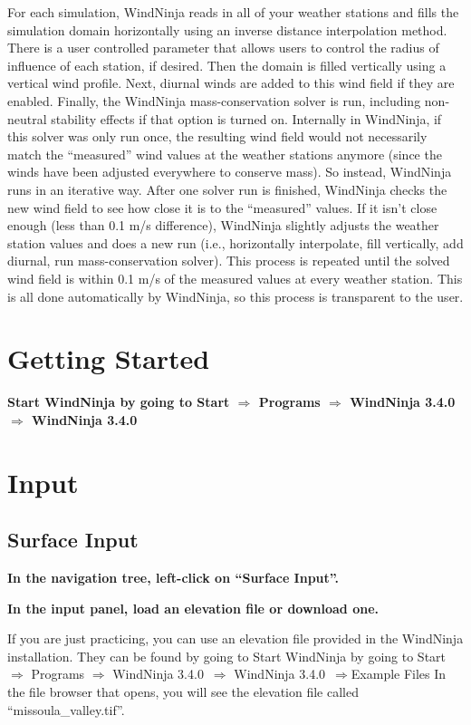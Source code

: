 \documentclass[12pt]{article}
\newcommand\vn{3.4.0}
\begin{document}
For each simulation, WindNinja reads in all of your weather stations and fills the simulation domain horizontally using an inverse distance interpolation method.  There is a user controlled parameter that allows users to control the radius of influence of each station, if desired.  Then the domain is filled vertically using a vertical wind profile.  Next, diurnal winds are added to this wind field if they are enabled.  Finally, the WindNinja mass-conservation solver is run, including non-neutral stability effects if that option is turned on.  Internally in WindNinja, if this solver was only run once, the resulting wind field would not necessarily match the “measured” wind values at the weather stations anymore (since the winds have been adjusted everywhere to conserve mass).  So instead, WindNinja runs in an iterative way.  After one solver run is finished, WindNinja checks the new wind field to see how close it is to the “measured” values.  If it isn't close enough (less than 0.1 m/s difference), WindNinja slightly adjusts the weather station values and does a new run (i.e., horizontally interpolate, fill vertically, add diurnal, run mass-conservation solver).  This process is repeated until the solved wind field is within 0.1 m/s of the measured values at every weather station.  This is all done automatically by WindNinja, so this process is transparent to the user.  

\section{Getting Started}

\textbf{\color{red}Start WindNinja by going to Start $\Rightarrow$ Programs $\Rightarrow$ WindNinja \vn\ $\Rightarrow$ WindNinja \vn\ }

\section{Input}
\subsection{Surface Input}

\textbf{\color{red}In the navigation tree, left-click on “Surface Input”.}

\textbf{\color{red}
In the input panel, load an elevation file or download one.}

If you are just practicing, you can use an elevation file provided in the WindNinja installation.  They can be found by going to Start WindNinja by going to Start $\Rightarrow$ Programs $\Rightarrow$ WindNinja \vn\ $\Rightarrow$ WindNinja \vn\ $\Rightarrow$Example Files  In the file browser that opens, you will see the elevation file called “missoula\_valley.tif”.
\end{document}
